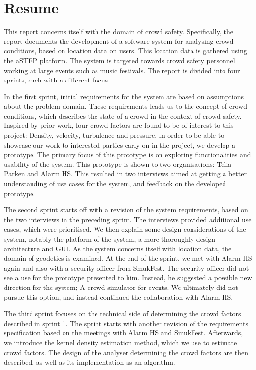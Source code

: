 \chapter*{Resume}

This report concerns itself with the domain of crowd safety. Specifically, the report documents the development of a software system for analysing crowd conditions, based on location data on users. This location data is gathered using the aSTEP platform. The system is targeted towards crowd safety personnel working at large events such as music festivals. The report is divided into four sprints, each with a different focus.

In the first sprint, initial requirements for the system are based on assumptions about the problem domain. These requirements leads us to the concept of crowd conditions, which describes the state of a crowd in the context of crowd safety. Inspired by prior work, four crowd factors are found to be of interest to this project: Density, velocity, turbulence and pressure. In order to be able to showcase our work to interested parties early on in the project, we develop a prototype. The primary focus of this prototype is on exploring functionalities and usability of the system. This prototype is shown to two organisations: Telia Parken and Alarm HS. This resulted in two interviews aimed at getting a better understanding of use cases for the system, and feedback on the developed prototype.

The second sprint starts off with a revision of the system requirements, based on the two interviews in the preceding sprint. The interviews provided additional use cases, which were prioritised. We then explain some design considerations of the system, notably the platform of the system, a more thoroughly design architecture and GUI. As the system concerns itself with location data, the domain of geodetics is examined. At the end of the sprint, we met with Alarm HS again and also with a security officer from SmukFest. The security officer did not see a use for the prototype presented to him. Instead, he suggested a possible new direction for the system; A crowd simulator for events. We ultimately did not pursue this option, and instead continued the collaboration with Alarm HS.

The third sprint focuses on the technical side of determining the crowd factors described in sprint 1. The sprint starts with another revision of the requirements specification based on the meetings with Alarm HS and SmukFest. Afterwards, we introduce the kernel density estimation method, which we use to estimate crowd factors. The design of the analyser determining the crowd factors are then described, as well as its implementation as an algorithm.

